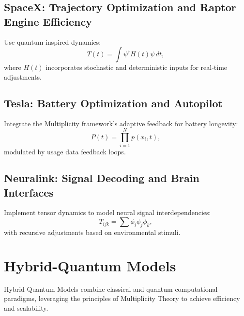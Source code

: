 \documentclass{article}
\theoremstyle{plain}
\begin{document}
\subsection{SpaceX: Trajectory Optimization and Raptor Engine Efficiency}
Use quantum-inspired dynamics:
\begin{equation}
T(t) = \int \psi^\dagger H(t) \psi \, dt,
\end{equation}
where $H(t)$ incorporates stochastic and deterministic inputs for real-time adjustments.

\subsection{Tesla: Battery Optimization and Autopilot}
Integrate the Multiplicity framework’s adaptive feedback for battery longevity:
\begin{equation}
P(t) = \prod_{i=1}^N p(x_i, t),
\end{equation}
modulated by usage data feedback loops.

\subsection{Neuralink: Signal Decoding and Brain Interfaces}
Implement tensor dynamics to model neural signal interdependencies:
\begin{equation}
T_{ijk} = \sum \phi_i \phi_j \phi_k,
\end{equation}
with recursive adjustments based on environmental stimuli.

\section{Hybrid-Quantum Models}
Hybrid-Quantum Models combine classical and quantum computational paradigms, leveraging the principles of Multiplicity Theory to achieve efficiency and scalability.
\end{document}

